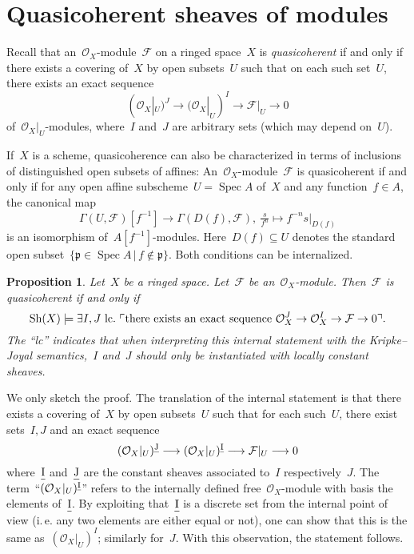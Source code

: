 \documentclass[10pt,reqno,a4paper]{amsbook}
\makeatletter
\theoremstyle{definition}
\theoremstyle{plain}
\newtheorem{prop}[defn]{Proposition}
\theoremstyle{remark}
\newcommand{\F}{\mathcal{F}}
\renewcommand{\O}{\mathcal{O}}
\newcommand{\ppp}{\mathfrak{p}}
\let\oldul\ul
\renewcommand{\ul}[1]{\text{\oldul{$#1$}}}
\newcommand{\Sh}{\mathrm{Sh}}
\DeclareMathOperator{\Spec}{Spec}
\newcommand{\?}{\,{:}\,}
\renewcommand{\_}{\mathpunct{.}\,}
\newcommand{\speak}[1]{\ulcorner\text{\textnormal{#1}}\urcorner}
\newcommand{\ie}{i.\,e.\@\xspace}
\renewenvironment{proof}[1][\proofname]{\par
  \pushQED{\qed}%
  \normalfont \topsep6\p@\@plus6\p@\relax
  \trivlist
  \item[\hskip\labelsep
        \itshape
    #1\@addpunct{.}]\ignorespaces
}{%
  \popQED\endtrivlist\@endpefalse
}
\makeatother
\begin{document}
\section{Quasicoherent sheaves of modules}
\label{sect:qcoh}

Recall that an~$\O_X$-module~$\F$ on a ringed space~$X$ is \emph{quasicoherent}
if and only if there exists a covering of~$X$ by open subsets~$U$ such that on
each such set~$U$, there exists an exact sequence
\[ (\O_X|_U)^J \longrightarrow (\O_X|_U)^I \longrightarrow \F|_U \longrightarrow 0 \]
of~$\O_X|_U$-modules, where~$I$ and~$J$ are arbitrary sets (which may depend
on~$U$).

If~$X$ is a scheme, quasicoherence can also be characterized in
terms of inclusions of distinguished open subsets of affines:
An~$\O_X$-module~$\F$ is quasicoherent if and only if for any open affine
subscheme~$U = \Spec A$ of~$X$ and any function~$f \in A$, the canonical map
\[ \Gamma(U,\F)[f^{-1}] \longrightarrow \Gamma(D(f),\F),\
  \tfrac{s}{f^n} \longmapsto f^{-n} s|_{D(f)} \]
is an isomorphism of~$A[f^{-1}]$-modules. Here~$D(f) \subseteq U$ denotes the
standard open subset~$\{ \ppp \in \Spec A \,|\, f \not\in \ppp \}$. Both
conditions can be internalized.

\begin{prop}Let~$X$ be a ringed space. Let~$\F$ be an~$\O_X$-module. Then~$\F$
is quasicoherent if and only if
\[ \Sh(X) \models \exists I,J\ \mathrm{lc}\_ \speak{there exists an
  exact sequence~$\O_X^J \to \O_X^I \to \F \to 0$}. \]
The ``\textnormal{lc}'' indicates that when interpreting this internal statement with the
Kripke--Joyal semantics,~$I$ and~$J$ should only be instantiated with
\emph{locally constant} sheaves.
\end{prop}
\begin{proof} We only sketch the proof.
The translation of the internal statement is that there exists a covering
of~$X$ by open subsets~$U$ such that for each such~$U$, there exist sets~$I,J$
and an exact sequence
\[ (\O_X|_U)^{\ul{J}} \longrightarrow (\O_X|_U)^{\ul{I}} \longrightarrow \F|_U
\longrightarrow 0 \]
where~$\ul{I}$ and~$\ul{J}$ are the constant sheaves associated to~$I$
respectively~$J$. The term~``$(\O_X|_U)^{\ul{I}}$'' refers to the internally
defined free~$\O_X$-module with basis the elements of~$\ul{I}$. By exploiting
that~$\ul{I}$ is a discrete set from the internal point of view (\ie any two
elements are either equal or not), one can show that this is the same
as~$(\O_X|_U)^I$; similarly for~$J$. With this observation, the statement
follows.
\end{proof}
\end{document}

